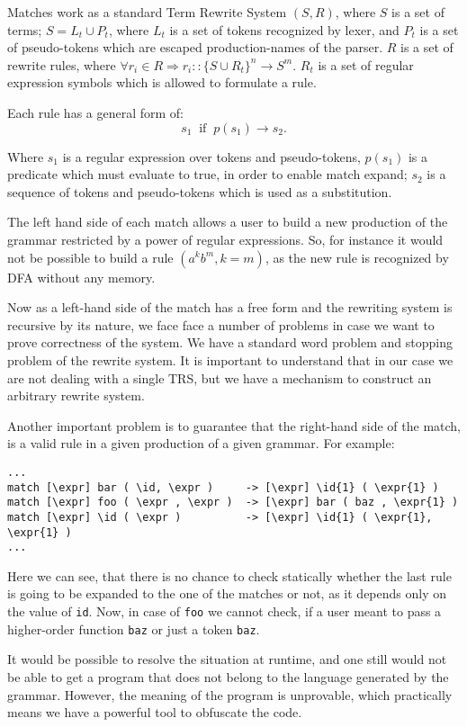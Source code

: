 
Matches work as a standard Term Rewrite System $(S, R)$, where 
$S$ is a set of terms; $S = L_t \cup P_t$, where $L_t$ is a set
of tokens recognized by lexer, and $P_t$ is a set of pseudo-tokens
which are escaped production-names of the parser.  $R$ is a set of
rewrite rules, where $\forall r_i \in R \Rightarrow r_i :: \{S \cup R_t\}^n
\to S^m$.  $R_t$ is a set of regular expression symbols which is
allowed to formulate a rule.

Each rule has a general form of:
$$
    s_1\;\;\textrm{if}\;\; p(s_1) \rightarrow s_2.
$$

Where $s_1$ is a regular expression over tokens and pseudo-tokens,
$p(s_1)$ is a predicate which must evaluate to true, in order to
enable match expand; $s_2$ is a sequence of tokens and pseudo-tokens
which is used as a substitution.

The left hand side of each match allows a user to build a new
production of the grammar restricted by a power of regular
expressions.  So, for instance it would not be possible to
build a rule $(a^kb^m, k = m)$, as the new rule is recognized
by DFA without any memory.

Now as a left-hand side of the match has a free form and the
rewriting system is recursive by its nature, we face face a 
number of problems in case we want to prove correctness of 
the system.  We have a standard word problem and stopping 
problem of the rewrite system.  It is important to understand
that in our case we are not dealing with a single TRS, but
we have a mechanism to construct an arbitrary rewrite system.

Another important problem is to guarantee that the right-hand
side of the match, is a valid rule in a given production of a
given grammar.  For example:
\begin{verbatim}
...
match [\expr] bar ( \id, \expr )     -> [\expr] \id{1} ( \expr{1} )
match [\expr] foo ( \expr , \expr )  -> [\expr] bar ( baz , \expr{1} )
match [\expr] \id ( \expr )          -> [\expr] \id{1} ( \expr{1}, \expr{1} )
...
\end{verbatim}
Here we can see, that there is no chance to check statically whether the 
last rule is going to be expanded to the one of the matches or not, as 
it depends only on the value of \verb|id|.  Now, in case of \verb|foo|
we cannot check, if a user meant to pass a higher-order function
\verb|baz| or just a token \verb|baz|.  

It would be possible to resolve the situation at runtime, and one
still would not be able to get a program that does not belong to the
language generated by the grammar.  However, the meaning of the
program is unprovable, which practically means we have a powerful
tool to obfuscate the code.

